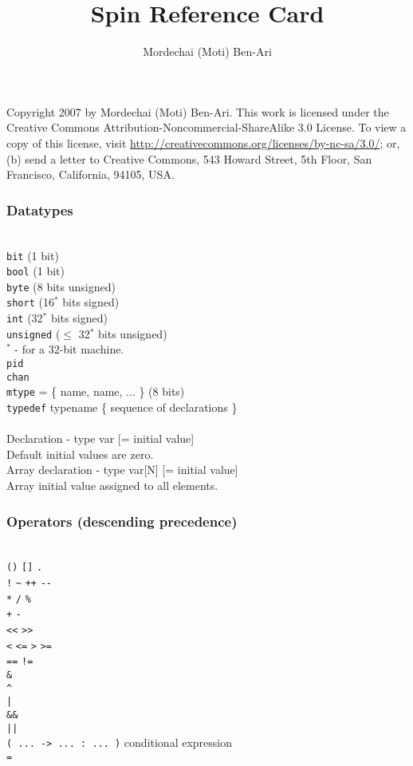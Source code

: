 \documentclass{leaflet}
\title{\vspace*{-2ex}Spin Reference Card}
\author{\vspace*{-2ex}Mordechai (Moti) Ben-Ari\vspace*{-2ex}}
\newcommand{\sct}[1]{\subsubsection{#1}\mbox{}\\}
\newcommand{\spc}{\hspace*{1.5em}}
\begin{document}
\maketitle
\thispagestyle{empty}
\vspace*{-2ex}
{\scriptsize Copyright 2007 by Mordechai (Moti) Ben-Ari.
This work is licensed under the Creative Commons
Attribution-Noncommercial-ShareAlike 3.0 License. 
To view a copy of this license, 
visit \url{http://creativecommons.org/licenses/by-nc-sa/3.0/}; 
or, (b) send a letter to Creative Commons, 
543 Howard Street, 5th Floor, San Francisco, California, 94105, USA.}

\sct{Datatypes}
\texttt{bit} (1 bit)\\
\texttt{bool} (1 bit)\\
\texttt{byte} (8 bits unsigned)\\
\texttt{short} (16$^{*}$ bits signed)\\
\texttt{int} (32$^{*}$ bits signed)\\
\texttt{unsigned} ($\leq$ 32$^{*}$ bits unsigned)\\
\spc{}$^{*}$ - for a 32-bit machine.\\
\texttt{pid}\\
\texttt{chan}\\
\texttt{mtype} = \{ name, name, ... \} (8 bits) \\
\texttt{typedef} typename \{ sequence of declarations \}\\
\\
Declaration - type var [= initial value]\\
Default initial values are zero.\\
Array declaration - type var[N] [= initial value]\\
Array initial value assigned to all elements.

\sct{Operators (descending precedence)}
\spc{}\verb+()+ \spc{}\verb+[]+ \spc{}\verb+.+ \\
\spc{}\verb+!+ \spc{}\verb+~+ \spc{}\verb=++= \spc{}\verb+--+\\
\spc{}\verb+*+ \spc{}\verb+/+ \spc{}\verb+%+\\
\spc{}\verb=+= \spc{}\verb+-+ \\
\spc{}\verb+<<+ \spc{}\verb+>>+ \\
\spc{}\verb+<+ \spc{}\verb+<=+ \spc{}\verb+>+ \spc{}\verb+>= +\\
\spc{}\verb+==+ \spc{}\verb+!=+\\
\spc{}\verb+&+ \\
\spc{}\verb+^+ \\
\spc{}\verb=|= \\
\spc{}\verb+&&+\\
\spc{}\verb=||=\\
\spc{}\verb+( ... -> ... : ... )+ conditional expression\\
\spc{}\verb+=+
\end{document}
